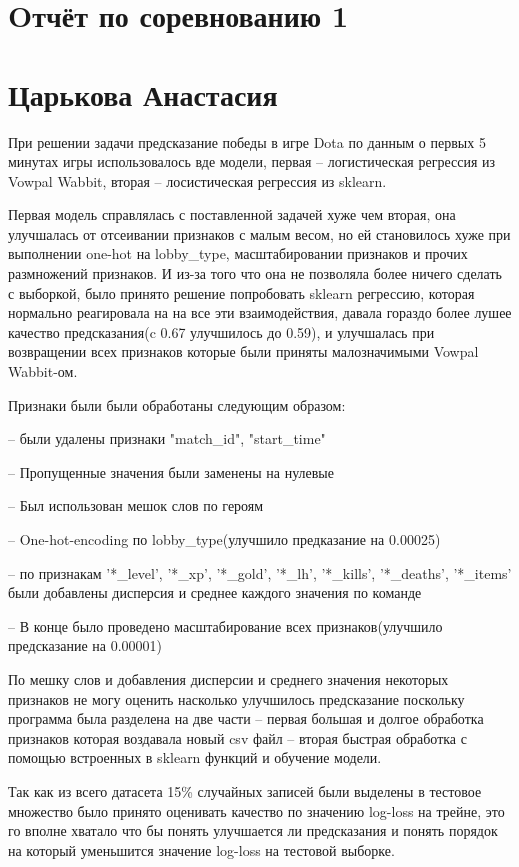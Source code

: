 \documentclass[10pt,reqno]{amsart}
\theoremstyle{definition}
\theoremstyle{remark}
\begin{document}
\section*{Oтчёт по соревнованию 1}
\section*{Царькова Анастасия}

При решении задачи предсказание победы в игре Dota по данным о первых 5 минутах игры использовалось вде модели, первая -- логистическая регрессия из Vowpal Wabbit, вторая -- лосистическая регрессия из sklearn.
\newline



Первая модель справлялась с поставленной задачей хуже чем вторая, она улучшалась от отсеивании признаков с малым весом, но ей становилось хуже при выполнении one-hot на lobby\_type, масштабировании признаков и прочих размножений признаков. И из-за того  что она не позволяла более ничего сделать с выборкой, было принято решение попробовать sklearn регрессию, которая нормально реагировала на на все эти взаимодействия, давала гораздо более лушее качество предсказания(c 0.67 улучшилось до 0.59), и улучшалась при возвращении всех признаков которые были приняты малозначимыми Vowpal Wabbit-ом.
\newline


Признаки были были обработаны следующим образом:
\newline

-- были удалены признаки "match\_id", "start\_time"
\newline

-- Пропущенные значения были заменены на нулевые
\newline

-- Был использован мешок слов по героям
\newline


-- One-hot-encoding по lobby\_type(улучшило предказание на 0.00025)
\newline


-- по признакам '*\_level', '*\_xp', '*\_gold', '*\_lh', '*\_kills', '*\_deaths', '*\_items' были добавлены дисперсия и среднее каждого значения по команде
\newline


-- В конце было проведено масштабирование всех признаков(улучшило предсказание на 0.00001)
\newline


По мешку слов и добавления дисперсии и среднего значения некоторых признаков не могу оценить насколько улучшилось предсказание поскольку программа была разделена на две части -- первая большая и долгое обработка признаков которая воздавала новый csv файл -- вторая быстрая обработка с помощью встроенных в sklearn функций и обучение модели.
\newline


Так как из всего датасета 15\% случайных записей были выделены в тестовое множество  было принято оценивать качество по значению log-loss на трейне, это го вполне хватало что бы понять улучшается ли предсказания и понять порядок на который уменьшится значение log-loss на тестовой выборке.
\end{document}
